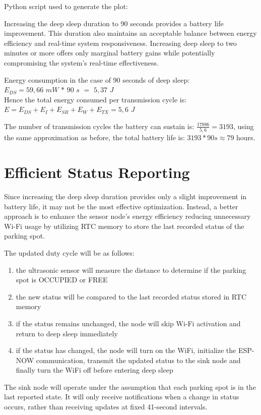 \documentclass{Configuration_Files/PoliMi3i_thesis}
\begin{document}
\newpage
Python script used to generate the plot:


Increasing the deep sleep duration to 90 seconds provides a battery life improvement. This duration also maintains an acceptable balance between energy efficiency and real-time system responsiveness. Increasing deep sleep to two minutes or more offers only marginal battery gains while potentially compromising the system’s real-time effectiveness.

Energy consumption in the case of 90 seconds of deep sleep:\\
$E_{DS} =59,66$ $mW$ $*$ $90$ $s$ $=$ $5,37$ $J$ \\
Hence the total energy consumed per transmission cycle is:\\
$E = E_{DS}+E_{I}+E_{SR}+E_{W}+E_{TX}=5,6$ $J$ 

The number of transmission cycles the battery can sustain is: $\frac{17886}{5,6}=3193$, using the same approximation as before, the total battery life is: $3193*90s\approx 79$ hours.


\section{Efficient Status Reporting}

Since increasing the deep sleep duration provides only a slight improvement in battery life, it may not be the most effective optimization. Instead, a better approach is to enhance the sensor node's energy efficiency reducing unnecessary Wi-Fi usage by utilizing RTC memory to store the last recorded status of the parking spot. 

The updated duty cycle will be as follows:
\begin{enumerate}
    \item the ultrasonic sensor will measure the distance to determine if the parking spot is OCCUPIED or FREE
    \item the new status will be compared to the last recorded status stored in RTC memory
    \item if the status remains unchanged, the node will skip Wi-Fi activation and return to deep sleep immediately
    \item if the status has changed, the node will turn on the WiFi, initialize the ESP-NOW communication, transmit the updated status to the sink node and finally turn the WiFi off before entering deep sleep
\end{enumerate}
The sink node will operate under the assumption that each parking spot is in the last reported state. It will only receive notifications when a change in status occurs, rather than receiving updates at fixed 41-second intervals.
\end{document}
